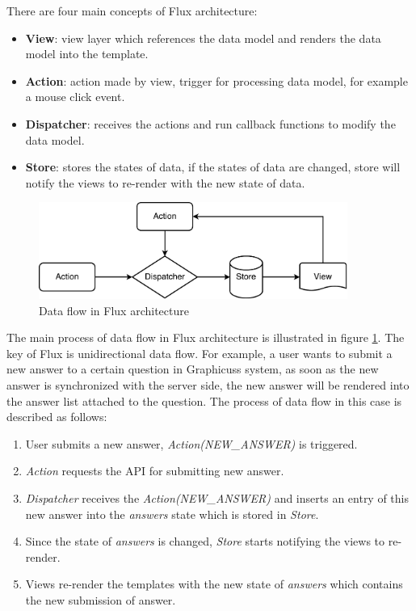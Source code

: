 There are four main concepts of Flux architecture: 
\begin{itemize}
  \item 
  \textbf{View}: view layer which references the data model and renders the data model into the template.
  \item 
  \textbf{Action}: action made by view, trigger for processing data model, for example a mouse click event.
  \item 
  \textbf{Dispatcher}: receives the actions and run callback functions to modify the data model.
  \item 
  \textbf{Store}: stores the states of data, if the states of data are changed, store will notify the views to re-render with the new state of data.
\end{itemize}

\begin{figure}[!htbp]
  \centering
    \includegraphics[width=0.9\textwidth]{Figures/imp-flux-arch.pdf}
  \caption{Data flow in Flux architecture}
  \label{fig:flux-arch-imp}
\end{figure}

The main process of data flow in Flux architecture is illustrated in figure \ref{fig:flux-arch-imp}. The key of Flux is unidirectional data flow. For example, a user wants to submit a new answer to a certain question in Graphicuss system, as soon as the new answer is synchronized with the server side, the new answer will be rendered into the answer list attached to the question. The process of data flow in this case is described as follows:
\begin{enumerate}
  \item 
  User submits a new answer, \textit{Action(NEW\_ANSWER)} is triggered.
  \item 
  \textit{Action} requests the API for submitting new answer.
  \item 
  \textit{Dispatcher} receives the \textit{Action(NEW\_ANSWER)} and inserts an entry of this new answer into the \textit{answers} state which is stored in \textit{Store}.
  \item 
  Since the state of \textit{answers} is changed, \textit{Store} starts notifying the views to re-render.
  \item 
  Views re-render the templates with the new state of \textit{answers} which contains the new submission of answer.
\end{enumerate}
